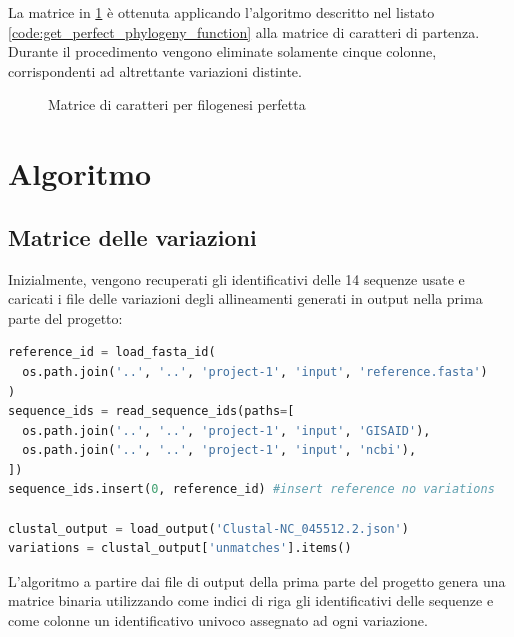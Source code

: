 \documentclass[11pt,italian]{article}
\begin{document}
La matrice in \cref{fig:matrix-perfect-phylo} è ottenuta applicando l'algoritmo descritto nel listato \ref{code:get_perfect_phylogeny_function} alla matrice di caratteri di partenza. Durante il procedimento vengono eliminate solamente cinque colonne, corrispondenti ad altrettante variazioni distinte.
\begin{figure}[H]
  \caption{Matrice di caratteri per filogenesi perfetta}
  \label{fig:matrix-perfect-phylo}
\end{figure}

\newpage
\section{Algoritmo}
\subsection{Matrice delle variazioni}
Inizialmente, vengono recuperati gli identificativi delle 14 sequenze usate e caricati i file delle variazioni degli allineamenti generati in output nella prima parte del progetto:

\begin{lstlisting}[language=Python,caption=Caricamento dei file necessari per l'elaborazione,label=code:read_input_files]
reference_id = load_fasta_id(
  os.path.join('..', '..', 'project-1', 'input', 'reference.fasta')
)
sequence_ids = read_sequence_ids(paths=[
  os.path.join('..', '..', 'project-1', 'input', 'GISAID'),
  os.path.join('..', '..', 'project-1', 'input', 'ncbi'),
])
sequence_ids.insert(0, reference_id) #insert reference no variations

clustal_output = load_output('Clustal-NC_045512.2.json')
variations = clustal_output['unmatches'].items()
\end{lstlisting}

\noindent
L'algoritmo a partire dai file di output della prima parte del progetto genera una matrice binaria utilizzando come indici di riga gli identificativi delle sequenze e come colonne un identificativo univoco assegnato ad ogni variazione.
\end{document}
